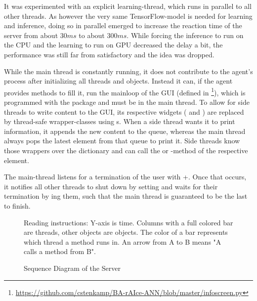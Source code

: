 It was experimented with an explicit learning-thread, which runs in parallel to all other threads. As however the very same TensorFlow-model is needed for learning and inference, doing so in parallel emerged to increase the reaction time of the server from about $30ms$ to about $300ms$. While forcing the inference to run on the CPU and the learning to run on GPU decreased the delay a bit, the performance was still far from satisfactory and the idea was dropped.

While the main thread is constantly running, it does not contribute to the agent's process after initializing all threads and objects. Instead it can, if the agent provides methods to fill it, run the mainloop of the GUI (defined in \footnote{\url{https://github.com/cstenkamp/BA-rAIce-ANN/blob/master/infoscreen.py}}), which is programmed with the package  and must be in the main thread. To allow for side threads to write content to the GUI, its respective widgets ( and ) are replaced by thread-safe wrapper-classes using s. When a side thread wants it to print information, it appends the new content to the queue, whereas the main thread always pops the latest element from that queue to print it. Side threads know those wrappers over the dictionary  and can call the  or -method of the respective element.

The main-thread listens for a termination of the user with +. Once that occurs, it notifies all other threads to shut down by setting  and waits for their termination by ing them, such that the main thread is guaranteed to be the last to finish.


\begin{figure}[h!]
	\centering
	\resizebox{1.1\textwidth}{!}{
		
	}
	\caption{Sequence Diagram of the Server}
	\label{fig:sequenceserver}
	\medskip
	\scriptsize
	Reading instructions: Y-axis is time. Columns with a full colored bar are threads, other objects are objects. The color of a bar represents which thread a method runs in. An arrow from A to B means "A calls a method from B". %
\end{figure}

